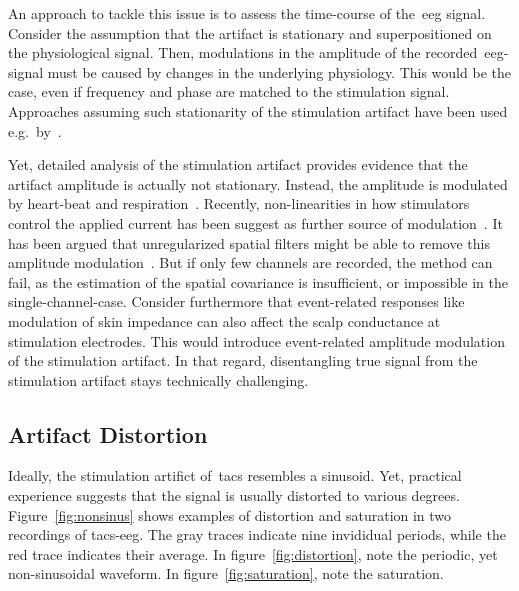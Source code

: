 \documentclass[a4paper]{article}
\begin{document}
An approach to tackle this issue is to assess the time-course of the~\gls{eeg} signal. Consider the assumption that the artifact is stationary and superpositioned on the physiological signal. Then, modulations in the amplitude of the recorded~\gls{eeg}-signal must be caused by changes in the underlying physiology.
This would be the case, even if frequency and phase are matched to the stimulation signal. Approaches assuming such stationarity of the stimulation artifact have been used e.g.\ by~\cite{Pogosyan_2009}.

Yet, detailed analysis of the stimulation artifact provides evidence that the artifact amplitude is actually not stationary. Instead, the amplitude is modulated by heart-beat and respiration~\citep{Noury_2016}. Recently, non-linearities in how stimulators control the applied current has been suggest as further source of modulation~\citep{Neuling_2017}.
It has been argued that unregularized spatial filters might be able to remove this amplitude modulation~\citep{Neuling_2017}. But if only few channels are recorded, the method can fail, as the estimation of the spatial covariance is insufficient, or impossible in the single-channel-case.
Consider furthermore that event-related responses like modulation of skin impedance can also affect the scalp conductance at stimulation electrodes. This would introduce event-related amplitude modulation of the stimulation artifact. In that regard, disentangling true signal from the stimulation artifact stays technically challenging.

\subsection{Artifact Distortion}

Ideally, the stimulation artifict of~\gls{tacs} resembles a sinusoid. Yet, practical experience suggests that the signal is usually distorted to various degrees.
Figure~\ref{fig:nonsinus} shows examples of distortion and saturation in two recordings of \gls{tacs}-\gls{eeg}. The gray traces indicate nine invididual periods, while the red trace indicates their average. In figure~\ref{fig:distortion}, note the periodic, yet non-sinusoidal waveform. In figure~\ref{fig:saturation}, note the saturation.
\end{document}
